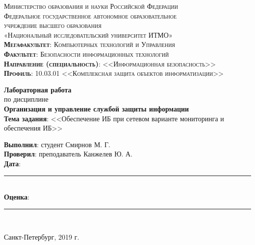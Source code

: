 \begin{titlepage}
	\begin{center}
		\textsc{
			\fontsize{12pt}{14pt}\selectfont
			Министерство образования и науки Российской Федерации\\
			Федеральное государственное автономное образовательное\\
			учреждение высшего образования\\
			«Национальный исследовательский университет ИТМО»\\
			\textbf{Мегафакультет}:  Компьютерных технологий и Управления\\
			\textbf{Факультет}: Безопасности информационных технологий\\
			\textbf{Направление (специальность)}: <<Информационная безопасность>>\\
			\textbf{Профиль}: 10.03.01 <<Комплексная защита объектов информатизации>>}
		
		\vfill
		
		\textbf{Лабораторная работа}\\
		по дисциплине\\
		\textbf{Организация и управление службой защиты информации}\\
	\vfill
	\textbf{Тема задания}: <<Обеспечение ИБ при сетевом варианте мониторинга и обеспечения ИБ>>\\
	\end{center}

	\vfill
	
	\begin{flushright}
	\textbf{Выполнил}: студент Смирнов М. Г. \\
	\textbf{Проверил}: преподаватель Канжелев Ю. А.\\
		\vfill
	\textbf{Дата}: \rule{10em}{.1pt}\\
	\textbf{Оценка}: \rule{10em}{.1pt}\\

	\vfill
	


	\end{flushright}
	\vfill
	\begin{center}
		Санкт-Петербург, 2019 г.
	\end{center}
\end{titlepage}